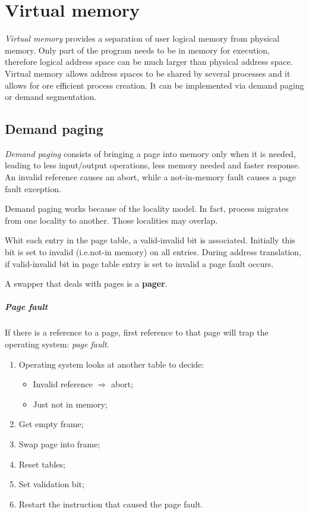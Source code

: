 \chapter{Virtual memory}
\emph{Virtual memory} provides a separation of user logical memory from physical memory. Only part of the program needs to be in memory for execution, therefore logical address space can be much larger than physical address space. Virtual memory allows address spaces to be shared by several processes and it allows for ore efficient process creation. It can be implemented via demand paging or demand segmentation.

\section{Demand paging}
\emph{Demand paging} consists of bringing a page into memory only when it is needed, leading to less input/output operations, less memory needed and faster response. An invalid reference causes an abort, while a not-in-memory fault causes a page fault exception.

Demand paging works because of the locality model. In fact, process migrates from one locality to another. Those localities may overlap.

Whit each entry in the page table, a valid-invalid bit is associated. Initially this bit is set to invalid (i.e.\@ not-in memory) on all entries. During address translation, if valid-invalid bit in page table entry is set to invalid a page fault occurs.

A swapper that deals with pages is a \textbf{pager}.

\paragraph{Page fault}
If there is a reference to a page, first reference to that page will trap the operating system: \emph{page fault}.
\begin{enumerate}
\item Operating system looks at another table to decide:
\begin{itemize}
\item Invalid reference $\Rightarrow$ abort;
\item Just not in memory;
\end{itemize}
\item Get empty frame;
\item Swap page into frame;
\item Reset tables;
\item Set validation bit;
\item Restart the instruction that caused the page fault.
\end{enumerate}

